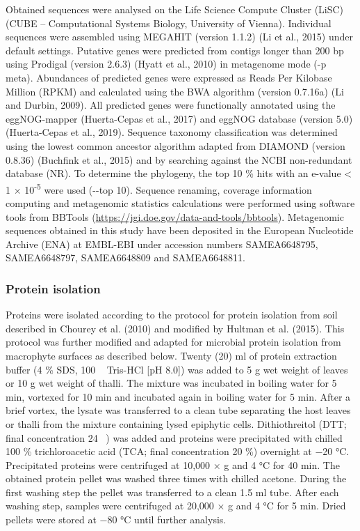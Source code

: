 \documentclass[12pt,]{article}
\begin{document}
Obtained sequences were analysed on the Life Science Compute Cluster
(LiSC) (CUBE -- Computational Systems Biology, University of Vienna).
Individual sequences were assembled using MEGAHIT (version 1.1.2) (Li et
al., 2015) under default settings. Putative genes were predicted from
contigs longer than 200 bp using Prodigal (version 2.6.3) (Hyatt et al.,
2010) in metagenome mode (-p meta). Abundances of predicted genes were
expressed as Reads Per Kilobase Million (RPKM) and calculated using the
BWA algorithm (version 0.7.16a) (Li and Durbin, 2009). All predicted
genes were functionally annotated using the eggNOG-mapper (Huerta-Cepas
et al., 2017) and eggNOG database (version 5.0) (Huerta-Cepas et al.,
2019). Sequence taxonomy classification was determined using the lowest
common ancestor algorithm adapted from DIAMOND (version 0.8.36)
(Buchfink et al., 2015) and by searching against the NCBI non-redundant
database (NR). To determine the phylogeny, the top 10 \si{\percent} hits
with an e-value \textless{} 1 × 10\textsuperscript{-5} were used
(-\/-top 10). Sequence renaming, coverage information computing and
metagenomic statistics calculations were performed using software tools
from BBTools (\url{https://jgi.doe.gov/data-and-tools/bbtools}).
Metagenomic sequences obtained in this study have been deposited in the
European Nucleotide Archive (ENA) at EMBL-EBI under accession numbers
SAMEA6648795, SAMEA6648797, SAMEA6648809 and SAMEA6648811.

\hypertarget{protein-isolation}{%
\subsubsection{Protein isolation}\label{protein-isolation}}

Proteins were isolated according to the protocol for protein isolation
from soil described in Chourey et al. (2010) and modified by Hultman et
al. (2015). This protocol was further modified and adapted for microbial
protein isolation from macrophyte surfaces as described below. Twenty
(20) \si{\ml} of protein extraction buffer (4 \si{\percent} SDS, 100
\si{\milli\Molar} Tris-HCl {[}pH 8.0{]}) was added to 5 \si{\g} wet
weight of leaves or 10 \si{\g} wet weight of thalli. The mixture was
incubated in boiling water for 5 \si{\minute}, vortexed for 10
\si{\minute} and incubated again in boiling water for 5 \si{\minute}.
After a brief vortex, the lysate was transferred to a clean tube
separating the host leaves or thalli from the mixture containing lysed
epiphytic cells. Dithiothreitol (DTT; final concentration 24
\si{\milli\Molar}) was added and proteins were precipitated with chilled
100 \si{\percent} trichloroacetic acid (TCA; final concentration 20
\si{\percent}) overnight at \num{-20} \si{\degreeCelsius}. Precipitated
proteins were centrifuged at 10,000 × g and 4 \si{\degreeCelsius} for 40
\si{\minute}. The obtained protein pellet was washed three times with
chilled acetone. During the first washing step the pellet was
transferred to a clean 1.5 \si{\ml} tube. After each washing step,
samples were centrifuged at 20,000 × g and 4 \si{\degreeCelsius} for 5
\si{\minute}. Dried pellets were stored at \num{-80} \si{\degreeCelsius}
until further analysis.
\end{document}
